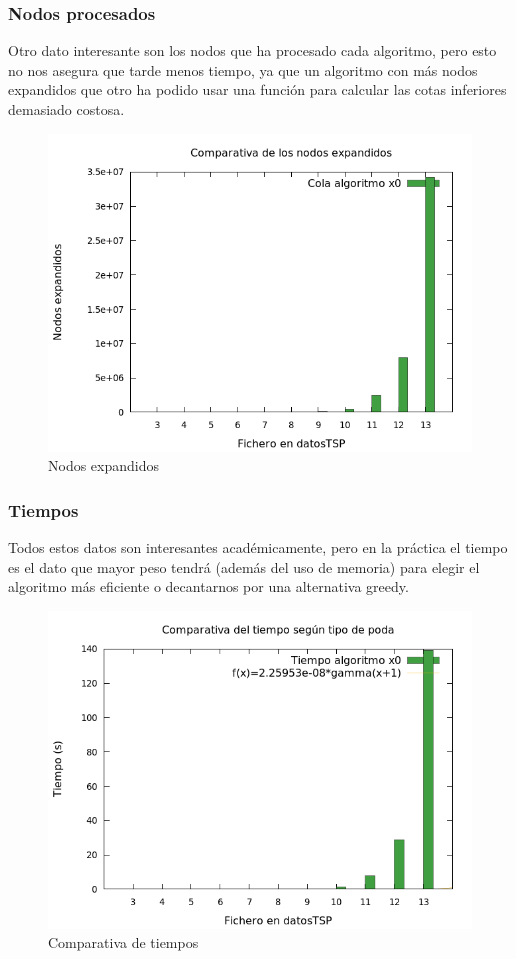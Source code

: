 \subsubsection{Nodos procesados}
Otro dato interesante son los nodos que ha procesado cada algoritmo, pero esto no nos asegura
que tarde menos tiempo, ya que un algoritmo con más nodos expandidos que otro ha podido usar una
función para calcular las cotas inferiores demasiado costosa.
\begin{figure}[H]
    \centering
    \includegraphics[scale=0.65]{../TSP/Graficas/graficaNodos.png}
    \caption{Nodos expandidos}
\end{figure}



\subsubsection{Tiempos}
Todos estos datos son interesantes académicamente, pero en la práctica el tiempo es el dato
que mayor peso tendrá (además del uso de memoria) para elegir el algoritmo más eficiente o 
decantarnos por una alternativa greedy.

\begin{figure}[H]
    \centering
    \includegraphics[scale=0.65]{../TSP/Graficas/graficaTiempos.png}
    \caption{Comparativa de tiempos}
\end{figure}



